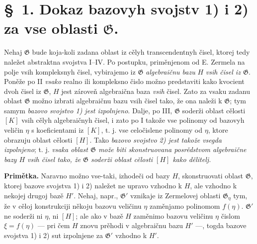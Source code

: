 \documentclass[11pt]{article}
\begin{document}
\section*{\S\ 1. Dokaz bazovyh svojstv 1) i 2) za vse oblasti $\mathfrak G$.}

Nehaj $\mathfrak G$ bude koja-koli zadana oblast iz cělyh transcendentnyh čisel, ktorej tedy naležet abstraktna svojstva I--IV. Po postupku, priměnjenom od E. Zermela na polje vsih kompleksnyh čisel, vybirajemo iz $\mathfrak G$ {\itshape algebraičnu bazu} $H$ {\itshape vsih čisel iz $\mathfrak G$}. Poněže po II {\itshape vsako} realno ili kompleksno čislo možno predstaviti kako kvocient dvoh čisel iz $\mathfrak G$, $H$ jest zároveň algebraična baza {\itshape vsih} čisel. Zato za vsaku zadanu oblast $\mathfrak G$ možno izbrati algebraičnu bazu vsih čisel tako, že ona naleži k $\mathfrak G$; tym samym {\itshape bazovo svojstvo 1) jest izpolnjeno}. Dalje, po III, $\mathfrak G$ soderži oblast cělosti $[K]$ vsih cělyh algebraičnyh čisel, i zato po I takože vse polinomy od bazovyh veličin $\eta$ s koeficientami iz $[K]$, t. j. vse celočislene polinomy od $\eta$, ktore obrazuju oblast cělosti $[H]$. Tako {\itshape bazovo svojstvo 2) jest takože vsegda izpolnjeno}; t. j. {\itshape vsaka oblast $\mathfrak G$ može biti skonstruovana posrědstvom algebraične bazy $H$ vsih čisel tako, že $\mathfrak G$ soderži oblast cělosti $[H]$ kako dělitelj.}

\textbf{Primětka.} Naravno možno vse-taki, izhodeči od bazy $H$, skonstruovati oblast $\mathfrak G$, ktorej bazove svojstva 1) i 2) naležet ne upravo vzhodno k $H$, ale vzhodno k nekojej drugoj bazě $H'$. Nehaj, napr., $\mathfrak G'$ vznikaje iz Zermelovej oblasti $\mathfrak G_\eta$ tym, že v cěloj konstrukciji někoju bazovu veličinu $\eta$ zaměnjamo polinomom $f(\eta)$. $\mathfrak G'$ ne soderži ni $\eta$, ni $[H]$; ale ako v bazě $H$ zaměnimo bazovu veličinu $\eta$ čislom $\xi=f(\eta)$ --- pri čem $H$ znovu prěhodi v algebraičnu bazu $H'$ ---, togda bazove svojstva 1) i 2) sut izpolnjene za $\mathfrak G'$ vzhodno k $H'$.
\end{document}
